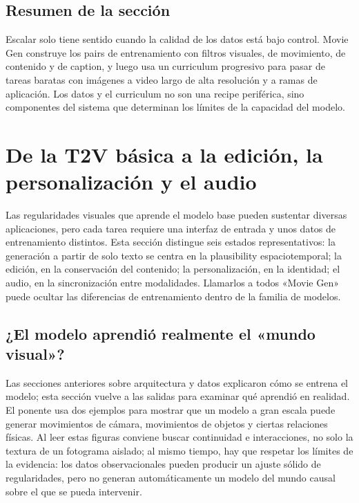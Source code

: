 \documentclass[a4paper]{article}
\begin{document}

\subsection{Resumen de la sección}

Escalar solo tiene sentido cuando la calidad de los datos está bajo control. Movie Gen construye los pairs de entrenamiento con filtros visuales, de movimiento, de contenido y de caption, y luego usa un curriculum progresivo para pasar de tareas baratas con imágenes a video largo de alta resolución y a ramas de aplicación. Los datos y el curriculum no son una recipe periférica, sino componentes del sistema que determinan los límites de la capacidad del modelo.
\section{De la T2V básica a la edición, la personalización y el audio}

Las regularidades visuales que aprende el modelo base pueden sustentar diversas aplicaciones, pero cada tarea requiere una interfaz de entrada y unos datos de entrenamiento distintos. Esta sección distingue seis estados representativos: la generación a partir de solo texto se centra en la plausibility espaciotemporal; la edición, en la conservación del contenido; la personalización, en la identidad; el audio, en la sincronización entre modalidades. Llamarlos a todos «Movie Gen» puede ocultar las diferencias de entrenamiento dentro de la familia de modelos.

\subsection{¿El modelo aprendió realmente el «mundo visual»?}

Las secciones anteriores sobre arquitectura y datos explicaron cómo se entrena el modelo; esta sección vuelve a las salidas para examinar qué aprendió en realidad. El ponente usa dos ejemplos para mostrar que un modelo a gran escala puede generar movimientos de cámara, movimientos de objetos y ciertas relaciones físicas. Al leer estas figuras conviene buscar continuidad e interacciones, no solo la textura de un fotograma aislado; al mismo tiempo, hay que respetar los límites de la evidencia: los datos observacionales pueden producir un ajuste sólido de regularidades, pero no generan automáticamente un modelo del mundo causal sobre el que se pueda intervenir.
\end{document}

